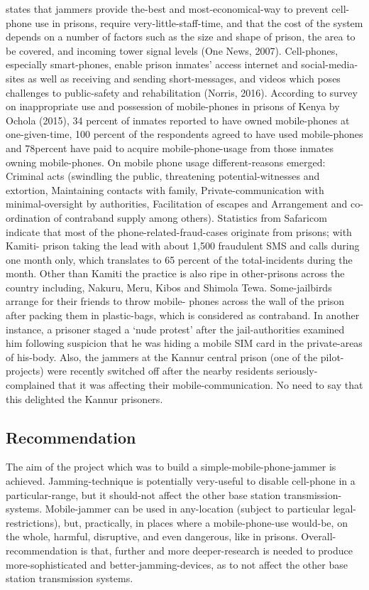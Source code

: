 \documentclass{article}
\begin{document}
states  that  jammers  provide  the-best  and  most-economical-way  to prevent  cell-  phone use  in prisons,  require  very-little-staff-time, and  that  the cost  of the  system  depends  on a number of factors such as the size and shape of prison, the area to be covered, and incoming tower signal levels (One  News,  2007).  Cell-phones,  especially  smart-phones,  enable  prison  inmates’  access  internet  and  social-media-sites as well as receiving and sending short-messages, and videos which poses challenges to public-safety and rehabilitation (Norris, 2016).  According to survey on inappropriate use and possession of mobile-phones in prisons of Kenya by Ochola  (2015), 34 percent of inmates  reported  to  have  owned  mobile-phones  at  one-given-time, 100 percent of the respondents agreed to have used mobile-phones and 78percent have paid to acquire mobile-phone-usage from  those  inmates  owning  mobile-phones. On  mobile  phone  usage  different-reasons  emerged:  Criminal  acts (swindling the public,  threatening  potential-witnesses and  extortion,  Maintaining contacts with family,  Private-communication  with  minimal-oversight  by  authorities,  Facilitation  of  escapes  and  Arrangement  and  co-ordination  of  contraband  supply  among  others).  Statistics  from  Safaricom  indicate  that  most  of  the  phone-related-fraud-cases originate from prisons; with Kamiti- prison taking the lead with about 1,500 fraudulent SMS and calls  during  one  month only,  which  translates to  65  percent of  the  total-incidents  during  the  month.  Other than Kamiti the practice is also ripe in other-prisons across the country including, Nakuru, Meru, Kibos and Shimola Tewa.  Some-jailbirds  arrange  for  their  friends  to  throw  mobile-  phones  across  the  wall  of  the  prison  after packing them in  plastic-bags, which is considered as contraband. In another  instance,  a  prisoner  staged  a  ‘nude protest’ after the jail-authorities examined him following suspicion that he  was hiding a mobile SIM card  in the private-areas  of  his-body.  Also,  the  jammers  at  the  Kannur  central  prison  (one  of  the  pilot-projects)  were recently  switched  off  after  the  nearby  residents  seriously-complained  that  it  was  affecting  their  mobile-communication. No need to say that this delighted the Kannur prisoners.
\subsection{Recommendation}
The  aim  of  the  project which  was  to build  a simple-mobile-phone-jammer  is  achieved.  Jamming-technique  is potentially very-useful to disable cell-phone in a  particular-range, but it  should-not  affect  the other base station transmission-systems.  Mobile-jammer can be used in  any-location (subject to  particular  legal-restrictions), but, practically,  in  places  where  a  mobile-phone-use  would-be,  on  the  whole,  harmful,  disruptive,  and  even dangerous,  like  in  prisons.  Overall-recommendation  is  that,  further  and  more  deeper-research  is  needed  to produce  more-sophisticated  and  better-jamming-devices,  as  to  not  affect  the  other  base  station  transmission systems.
\end{document}

